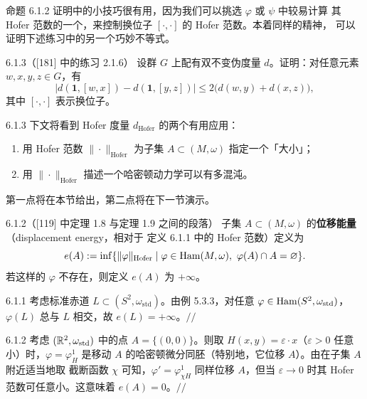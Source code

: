 命题 6.1.2 证明中的小技巧很有用，因为我们可以挑选 $\varphi$ 或 $\psi$ 中较易计算
其 Hofer 范数的一个，来控制换位子 $[\cdot,\cdot]$ 的 Hofer 范数。本着同样的精神，
可以证明下述练习中的另一个巧妙不等式。

\begin{wexer}{6.1.3（[181] 中的练习 2.1.6）}
  设群 $G$ 上配有双不变伪度量 $d$。证明：对任意元素 $w,x,y,z\in G$，有
  \[
    \bigl|d(\mathbf{1},[w,x])-d(\mathbf{1},[y,z])\bigr|
    \le 2\bigl(d(w,y)+d(x,z)\bigr),
  \]
  其中 $[\cdot,\cdot]$ 表示换位子。
\end{wexer}

\begin{wrem}{6.1.3}
  下文将看到 Hofer 度量 $d_{\mathrm{Hofer}}$ 的两个有用应用：
  \begin{enumerate}[label=(\roman*)]
    \item 用 Hofer 范数 $\|\cdot\|_{\mathrm{Hofer}}$ 为子集
          $A\subset(M,\omega)$ 指定一个「大小」；
    \item 用 $\|\cdot\|_{\mathrm{Hofer}}$ 描述一个哈密顿动力学可以有多混沌。
  \end{enumerate}
  第一点将在本节给出，第二点将在下一节演示。
\end{wrem}

\begin{wdefn}{6.1.2（[119] 中定理 1.8 与定理 1.9 之间的段落）}
  子集 $A\subset(M,\omega)$ 的\textbf{位移能量}（displacement energy，相对于
  定义 6.1.1 中的 Hofer 范数）定义为
  \[
    e(A):=\inf\{\|\varphi\|_{\mathrm{Hofer}}\mid
    \varphi\in\operatorname{Ham}(M,\omega),\ \varphi(A)\cap A=\varnothing\}.
  \]
  若这样的 $\varphi$ 不存在，则定义 $e(A)$ 为 $+\infty$。
\end{wdefn}


\begin{wexam}{6.1.1}
  考虑标准赤道 $L\subset(S^2,\omega_{\mathrm{std}})$。由例 5.3.3，对任意
  $\varphi\in\operatorname{Ham}(S^2,\omega_{\mathrm{std}})$，$\varphi(L)$ 总与 $L$ 相交，故
  $e(L)=+\infty$。\hfill$//$
\end{wexam}

\begin{wexam}{6.1.2}
  考虑 $(\mathbb{R}^2,\omega_{\mathrm{std}})$ 中的点 $A=\{(0,0)\}$。则取
  $H(x,y)=\varepsilon\cdot x$（$\varepsilon>0$ 任意小）时，$\varphi=\varphi_H^1$
  是移动 $A$ 的哈密顿微分同胚（特别地，它位移 $A$）。由在子集 $A$ 附近适当地取
  截断函数 $\chi$ 可知，$\varphi'=\varphi_{\chi H}^1$ 同样位移 $A$，但当
  $\varepsilon\to 0$ 时其 Hofer 范数可任意小。这意味着 $e(A)=0$。\hfill$//$
\end{wexam}

